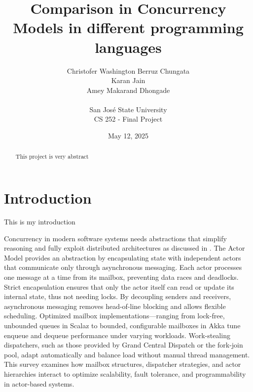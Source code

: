 \documentclass[12pt]{article}
\begin{document}
\title{Comparison in Concurrency Models in different programming languages}
\author{
    Christofer Washington Berruz Chungata \\ 
    Karan Jain \\ 
    Amey Makarand Dhongade \\ 
    \\
    San Jos\'{e} State University \\ 
    CS 252 - Final Project
}
\date{May 12, 2025}

\maketitle

\begin{abstract}
This project is very abstract
\end{abstract}

\section{Introduction\label{sec:introduction}}
This is my introduction

Concurrency in modern software systems needs abstractions
that simplify reasoning and fully exploit distributed
architectures as discussed in \cite{10.1145/357980.358021}.
The Actor Model provides an abstraction by encapsulating state
with independent actors that communicate only through
asynchronous messaging. Each actor processes one message
at a time from its mailbox, preventing data races and deadlocks.
Strict encapsulation ensures that only the actor itself can read
or update its internal state, thus not  needing locks.
By decoupling senders and receivers, asynchronous messaging
removes head-of-line blocking and allows flexible scheduling.
Optimized mailbox implementations—ranging from lock-free,
unbounded queues in Scalaz to bounded,
configurable mailboxes in Akka tune enqueue and dequeue
performance under varying workloads. Work-stealing dispatchers,
such as those provided by Grand Central Dispatch or the fork-join pool,
adapt automatically and balance load without manual thread management.
This survey examines how mailbox structures, dispatcher strategies,
and actor hierarchies interact to optimize scalability, fault tolerance,
and programmability in actor-based systems.







\end{document}

